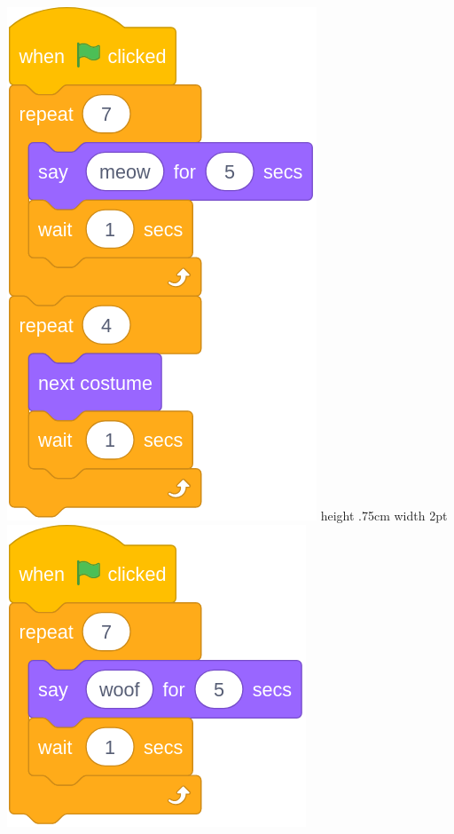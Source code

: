 \documentclass[letterpaper,12pt]{article}
\begin{document}
\includegraphics[scale=.3,valign=t]{q5_script0.png} \hspace{1cm}
 \vline height .75cm width 2pt \hspace{1cm}
\includegraphics[scale=.3, valign=t]{q5_script1.png} \hspace{1cm}
\end{document}
